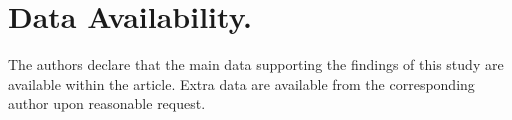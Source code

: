 \documentclass[fleqn,10pt]{wlscirep}
\begin{document}
\section*{Data Availability.}
The authors declare that the main data supporting the findings of this study are available within the article. Extra data are available from the corresponding author upon reasonable request.\\









\end{document}
